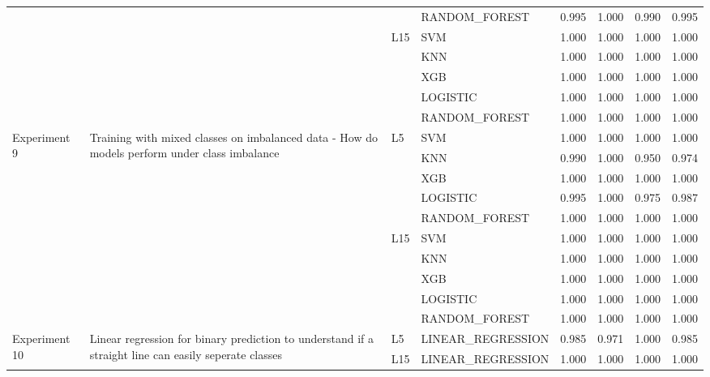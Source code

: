\begin{table}
\begin{tabular}{llllrrrr}
 &  &  & RANDOM\_FOREST & 0.995 & 1.000 & 0.990 & 0.995 \\
\cline{3-8}
 &  & \multirow[t]{5}{*}{L15} & SVM & 1.000 & 1.000 & 1.000 & 1.000 \\
 &  &  & KNN & 1.000 & 1.000 & 1.000 & 1.000 \\
 &  &  & XGB & 1.000 & 1.000 & 1.000 & 1.000 \\
 &  &  & LOGISTIC & 1.000 & 1.000 & 1.000 & 1.000 \\
 &  &  & RANDOM\_FOREST & 1.000 & 1.000 & 1.000 & 1.000 \\
\cline{1-8} \cline{2-8} \cline{3-8}
\multirow[t]{10}{*}{Experiment 9} & \multirow[t]{10}{*}{Training with mixed classes on imbalanced data - How do models perform under class imbalance} & \multirow[t]{5}{*}{L5} & SVM & 1.000 & 1.000 & 1.000 & 1.000 \\
 &  &  & KNN & 0.990 & 1.000 & 0.950 & 0.974 \\
 &  &  & XGB & 1.000 & 1.000 & 1.000 & 1.000 \\
 &  &  & LOGISTIC & 0.995 & 1.000 & 0.975 & 0.987 \\
 &  &  & RANDOM\_FOREST & 1.000 & 1.000 & 1.000 & 1.000 \\
\cline{3-8}
 &  & \multirow[t]{5}{*}{L15} & SVM & 1.000 & 1.000 & 1.000 & 1.000 \\
 &  &  & KNN & 1.000 & 1.000 & 1.000 & 1.000 \\
 &  &  & XGB & 1.000 & 1.000 & 1.000 & 1.000 \\
 &  &  & LOGISTIC & 1.000 & 1.000 & 1.000 & 1.000 \\
 &  &  & RANDOM\_FOREST & 1.000 & 1.000 & 1.000 & 1.000 \\
\cline{1-8} \cline{2-8} \cline{3-8}
\multirow[t]{2}{*}{Experiment 10} & \multirow[t]{2}{*}{Linear regression for binary prediction to understand if a straight line can easily seperate classes} & L5 & LINEAR\_REGRESSION & 0.985 & 0.971 & 1.000 & 0.985 \\
\cline{3-8}
 &  & L15 & LINEAR\_REGRESSION & 1.000 & 1.000 & 1.000 & 1.000 \\
\cline{1-8} \cline{2-8} \cline{3-8}
\bottomrule
\end{tabular}
\end{table}
